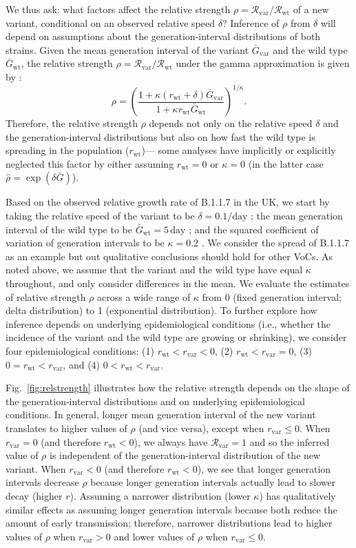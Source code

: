\documentclass[12pt]{article}
\newcommand{\fref}[1]{Fig.~\ref{fig:#1}}
\newcommand{\vvvar}{\mathrm{var}}
\newcommand{\wwwt}{\mathrm{wt}}
\newcommand{\rx}[1]{\ensuremath{{r}_{#1}}\xspace}
\newcommand{\rw}{\rx{\wwwt}}
\newcommand{\rv}{\rx{\vvvar}}
\newcommand{\Rx}[1]{\ensuremath{{\mathcal R}_{#1}}\xspace}
\newcommand{\Rw}{\Rx{\wwwt}}
\newcommand{\Rv}{\Rx{\vvvar}}
\newcommand{\days}{\ensuremath{\, \textrm{day}}}
\newcommand{\Gx}[1]{\ensuremath{{\bar G}_{#1}}\xspace}
\newcommand{\Gw}{\Gx{\wwwt}}
\newcommand{\Gv}{\Gx{\vvvar}}
\begin{document}
We thus ask: what factors affect the relative strength $\rho = \Rv/\Rw$ of a new variant, conditional on an observed relative speed $\delta$?
Inference of $\rho$ from $\delta$ will depend on assumptions about the generation-interval distributions of both strains.
Given the mean generation interval of the variant $\Gv$ and the wild type $\Gw$, the relative strength $\rho = \Rv/\Rw$ under the gamma approximation is given by \citep{park2019practical}:
\begin{equation}
\rho = \left(\frac{1 + \kappa (\rw + \delta) \Gv}{1 + \kappa \rw \Gw}\right)^{1/\kappa}.
\end{equation}
Therefore, the relative strength $\rho$ depends not only on the relative speed $\delta$ and the generation-interval distributions but also on how fast the wild type is spreading in the population (\rw)---
some analyses have implicitly or explicitly neglected this factor by either assuming $\rw = 0$ \citep{switzerland2021variant} or $\kappa = 0$ \citep{davies2021estimated} (in the latter case $\hat{\rho} = \exp(\delta \bar{G})$).

Based on the observed relative growth rate of B.1.1.7 in the UK, we start by  taking the relative speed of the variant to be $\delta = 0.1/\textrm{day}$  \citep{davies2021estimated}; the mean generation interval of the wild type to be $\Gw = 5\days$ \citep{ferretti2020quantifying}; and the squared coefficient of variation of generation intervals to be $\kappa=0.2$ \citep{ferretti2020quantifying}.
We consider the spread of B.1.1.7 as an example but out qualitative conclusions should hold for other VoCs.
As noted above, we assume that the variant and the wild type have equal $\kappa$ throughout, and only consider differences in the mean.
We evaluate the estimates of relative strength $\rho$ across a wide range of $\kappa$ from 0 (fixed generation interval; delta distribution) to 1 (exponential distribution).
To further explore how inference depends on underlying epidemiological conditions (i.e., whether the incidence of the variant and the wild type are growing or shrinking), we consider four epidemiological conditions: (1) $\rw < \rv < 0$, (2) $\rw < \rv = 0$, (3) $0 = \rw < \rv$, and (4) $0 < \rw < \rv$.

\fref{relstrength} illustrates how the relative strength depends on the shape of the generation-interval distributions and on underlying epidemiological conditions.
In general, longer mean generation interval of the new variant translates to higher values of $\rho$ (and vice versa), except when $\rv \leq 0$.
When $\rv = 0$ (and therefore $\rw < 0$), we always have $\Rv = 1$ and so the inferred value of $\rho$ is independent of the generation-interval distribution of the new variant.
When $\rv < 0$ (and therefore $\rw < 0$), we see that longer generation intervals decrease $\rho$ because longer generation intervals actually lead to slower decay (higher $r$).
Assuming a narrower distribution (lower $\kappa$) has qualitatively similar effects as assuming longer generation intervals because both reduce the amount of early transmission; 
therefore, narrower distributions lead to higher values of $\rho$ when $\rv > 0$ and lower values of $\rho$ when $\rv \leq 0$.
\end{document}
